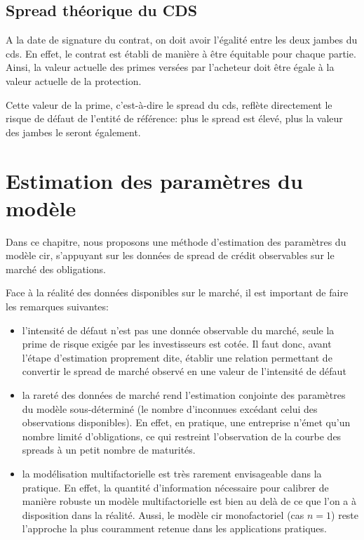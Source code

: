 \section{Spread théorique du CDS}

A la date de signature du contrat, on doit avoir l'égalité entre les deux jambes du \gls{cds}. En effet, le contrat est établi de manière à être équitable pour chaque partie. Ainsi, la valeur actuelle des primes versées par l'acheteur doit être égale à la valeur actuelle de la protection.

Cette valeur de la prime, c'est-à-dire le spread du \gls{cds}, reflète directement le risque de défaut de l'entité de référence: plus le spread est élevé, plus la valeur des jambes le seront également.


\chapter{Estimation des paramètres du modèle}

Dans ce chapitre, nous proposons une méthode d'estimation des paramètres du modèle \gls{cir}, s'appuyant sur les données de spread de crédit observables sur le marché des obligations.

Face à la réalité des données disponibles sur le marché, il est important de faire les remarques suivantes:

\begin{itemize}
    \item l'intensité de défaut n'est pas une donnée observable du marché, seule la prime de risque exigée par les investisseurs est cotée. Il faut donc, avant l'étape d'estimation proprement dite, établir une relation permettant de convertir le spread de marché observé en une valeur de l'intensité de défaut
    \item la rareté des données de marché rend l’estimation conjointe des paramètres du modèle sous-déterminé (le nombre d’inconnues excédant celui des observations disponibles). En effet, en pratique, une entreprise n’émet qu’un nombre limité d’obligations, ce qui restreint l’observation de la courbe des spreads à un petit nombre de maturités.
    \item la modélisation multifactorielle est très rarement envisageable dans la pratique. En effet, la quantité d'information nécessaire pour calibrer de manière robuste un modèle multifactorielle est bien au delà de ce que l'on a à disposition dans la réalité. Aussi, le modèle \gls{cir} monofactoriel (cas $n = 1$) reste l'approche la plus couramment retenue dans les applications pratiques.
\end{itemize}


